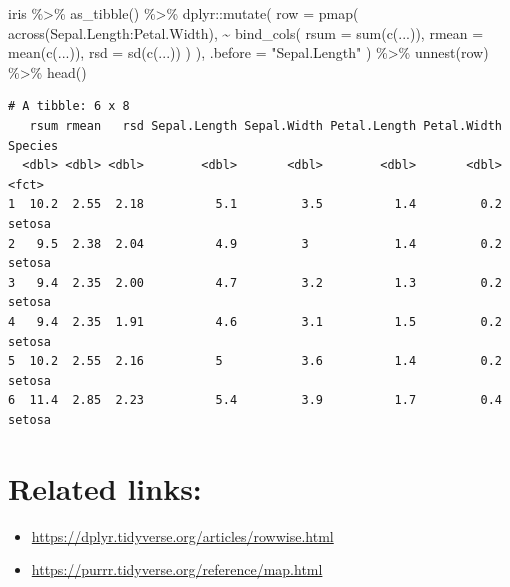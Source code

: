\documentclass[
  letterpaper,
  DIV=11,
  numbers=noendperiod]{scrartcl}
\newenvironment{Shaded}{}{}
\newcommand{\AttributeTok}[1]{\textcolor[rgb]{0.65,0.15,0.64}{#1}}
\newcommand{\FunctionTok}[1]{\textcolor[rgb]{0.25,0.47,0.95}{#1}}
\newcommand{\NormalTok}[1]{\textcolor[rgb]{0.22,0.23,0.26}{#1}}
\newcommand{\SpecialCharTok}[1]{\textcolor[rgb]{0.00,0.52,0.74}{#1}}
\newcommand{\StringTok}[1]{\textcolor[rgb]{0.31,0.63,0.31}{#1}}
\providecommand{\tightlist}{%
  \setlength{\itemsep}{0pt}\setlength{\parskip}{0pt}}\usepackage{longtable,booktabs,array}
\begin{document}
\begin{Shaded}
\begin{Highlighting}[]
\NormalTok{iris }\SpecialCharTok{\%\textgreater{}\%}
  \FunctionTok{as\_tibble}\NormalTok{() }\SpecialCharTok{\%\textgreater{}\%}
\NormalTok{  dplyr}\SpecialCharTok{::}\FunctionTok{mutate}\NormalTok{(}
    \AttributeTok{row =} \FunctionTok{pmap}\NormalTok{(}
      \FunctionTok{across}\NormalTok{(Sepal.Length}\SpecialCharTok{:}\NormalTok{Petal.Width),}
      \SpecialCharTok{\textasciitilde{}} \FunctionTok{bind\_cols}\NormalTok{(}
        \AttributeTok{rsum =} \FunctionTok{sum}\NormalTok{(}\FunctionTok{c}\NormalTok{(...)),}
        \AttributeTok{rmean =} \FunctionTok{mean}\NormalTok{(}\FunctionTok{c}\NormalTok{(...)),}
        \AttributeTok{rsd =} \FunctionTok{sd}\NormalTok{(}\FunctionTok{c}\NormalTok{(...))}
\NormalTok{      )}
\NormalTok{    ),}
    \AttributeTok{.before =} \StringTok{"Sepal.Length"}
\NormalTok{  ) }\SpecialCharTok{\%\textgreater{}\%}
  \FunctionTok{unnest}\NormalTok{(row) }\SpecialCharTok{\%\textgreater{}\%}
  \FunctionTok{head}\NormalTok{()}
\end{Highlighting}
\end{Shaded}

\begin{verbatim}
# A tibble: 6 x 8
   rsum rmean   rsd Sepal.Length Sepal.Width Petal.Length Petal.Width Species
  <dbl> <dbl> <dbl>        <dbl>       <dbl>        <dbl>       <dbl> <fct>  
1  10.2  2.55  2.18          5.1         3.5          1.4         0.2 setosa 
2   9.5  2.38  2.04          4.9         3            1.4         0.2 setosa 
3   9.4  2.35  2.00          4.7         3.2          1.3         0.2 setosa 
4   9.4  2.35  1.91          4.6         3.1          1.5         0.2 setosa 
5  10.2  2.55  2.16          5           3.6          1.4         0.2 setosa 
6  11.4  2.85  2.23          5.4         3.9          1.7         0.4 setosa 
\end{verbatim}

\section{Related links:}\label{related-links}

\begin{itemize}
\tightlist
\item
  \url{https://dplyr.tidyverse.org/articles/rowwise.html}
\item
  \url{https://purrr.tidyverse.org/reference/map.html}
\end{itemize}
\end{document}
